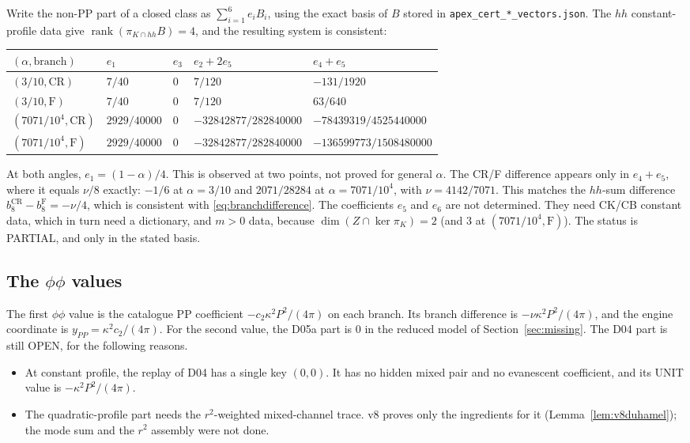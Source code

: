 \documentclass[11pt,a4paper]{article}
\newcommand{\ka}{\kappa}
\newcommand{\Fr}{\mathrm F}
\newcommand{\CR}{\mathrm{CR}}
\newcommand{\rank}{\operatorname{rank}}
\newcommand{\loc}[1]{\nolinkurl{#1}}
\newcommand{\OPEN}{\textsf{OPEN}}
\newcommand{\PARTIAL}{\textsf{PARTIAL}}
\theoremstyle{plain}
\theoremstyle{definition}
\theoremstyle{remark}
\numberwithin{equation}{section}
\begin{document}
Write the non-PP part of a closed class as \(\sum_{i=1}^6e_iB_i\),
using the exact basis of \(B\) stored in
\loc{apex_cert_*_vectors.json}.
The \(hh\) constant-profile data give
\(\rank(\pi_{K\cap hh}B)=4\), and the resulting system is consistent:
\begin{center}
\small
\begin{tabular}{@{}lllll@{}}
\toprule
\((\alpha,\text{branch})\) & \(e_1\) & \(e_3\) & \(e_2+2e_5\) & \(e_4+e_5\)\\
\midrule
\((3/10,\CR)\) & \(7/40\) & \(0\) & \(7/120\) & \(-131/1920\)\\
\((3/10,\Fr)\) & \(7/40\) & \(0\) & \(7/120\) & \(63/640\)\\
\((7071/10^4,\CR)\) & \(2929/40000\) & \(0\) &
\(-32842877/282840000\) & \(-78439319/4525440000\)\\
\((7071/10^4,\Fr)\) & \(2929/40000\) & \(0\) & \(-32842877/282840000\) & \(-136599773/1508480000\)\\
\bottomrule
\end{tabular}
\end{center}
At both angles, \(e_1=(1-\alpha)/4\). This is observed at two
points, not proved for general \(\alpha\).
The CR/F difference appears only in \(e_4+e_5\), where it equals
\(\nu/8\) exactly: \(-1/6\) at \(\alpha=3/10\) and \(2071/28284\) at
\(\alpha=7071/10^4\), with \(\nu=4142/7071\).
This matches the \(hh\)-sum difference
\(b_8^{\CR}-b_8^{\Fr}=-\nu/4\), which is consistent with
\eqref{eq:branchdifference}.
The coefficients \(e_5\) and \(e_6\) are not determined. They need
CK/CB constant data, which in turn need a dictionary, and
\(m>0\) data, because \(\dim(Z\cap\ker\pi_K)=2\) (and \(3\) at
\((7071/10^4,\Fr)\)).
The status is \PARTIAL, and only in the stated basis.

\subsection{The \texorpdfstring{\(\phi\phi\)}{phi phi} values}

The first \(\phi\phi\) value is the catalogue PP coefficient
\(-c_2\ka^2P^2/(4\pi)\) on each branch. Its branch difference is
\(-\nu\ka^2P^2/(4\pi)\), and the engine coordinate is
\(y_{PP}=\ka^2c_2/(4\pi)\).
For the second value, the D05a part is \(0\) in the reduced model
of Section~\ref{sec:missing}.
The D04 part is still \OPEN, for the following reasons.
\begin{itemize}
\item At constant profile, the replay of D04 has a single key
\((0,0)\). It has no hidden mixed pair and no evanescent
coefficient, and its UNIT value is \(-\ka^2P^2/(4\pi)\).
\item The quadratic-profile part needs the \(r^2\)-weighted
mixed-channel trace. v8 proves only the ingredients for it
(Lemma~\ref{lem:v8duhamel}); the mode sum and the \(r^2\)
assembly were not done.
\end{itemize}
\end{document}
